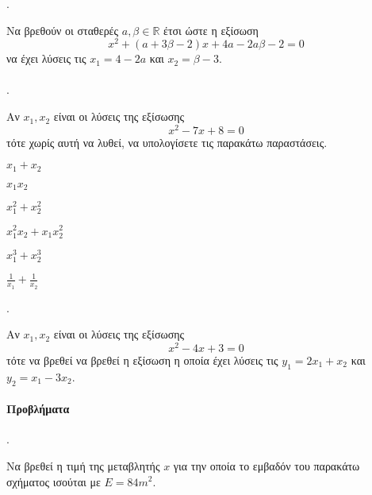 \documentclass[11pt,a4paper,twocolumn]{article}
\newcounter{askhsh}
\newcommand{\askhsh}{\large\theaskhsh.\ \addtocounter{askhsh}{1}}
\begin{document}
\askhsh
Να βρεθούν οι σταθερές $ a, \beta\in\mathbb{R} $ έτσι ώστε η εξίσωση
 \[ x^2+(a+3\beta-2)x+4a-2a\beta-2=0 \]
να έχει λύσεις τις $ x_1=4-2a $ και $ x_2=\beta-3 $.\\\\
\askhsh
Αν $ x_1,x_2 $ είναι οι λύσεις της εξίσωσης
\[ x^2-7x+8=0 \]
τότε χωρίς αυτή να λυθεί, να υπολογίσετε τις παρακάτω παραστάσεις.
\begin{multicols}{2}
\begin{alist}
\item $ x_1+x_2 $
\item $ x_1x_2 $
\item $ x_1^2+x_2^2 $
\item $ x_1^2x_2+x_1x_2^2 $
\item $ x_1^3+x_2^3 $
\item $ \frac{1}{x_1}+\frac{1}{x_2} $
\end{alist}
\end{multicols}
\askhsh
Αν $ x_1,x_2 $ είναι οι λύσεις της εξίσωσης \[ x^2-4x+3=0 \] τότε να βρεθεί να βρεθεί η εξίσωση η οποία έχει λύσεις τις $ y_1=2x_1+x_2 $ και $ y_2=x_1-3x_2 $.
\paragraph{Προβλήματα}
\askhsh
Να βρεθεί η τιμή της μεταβλητής $ x $ για την οποία το εμβαδόν του παρακάτω σχήματος ισούται με $ E=84m^2 $.
\begin{center}
\end{center}
\end{document}
